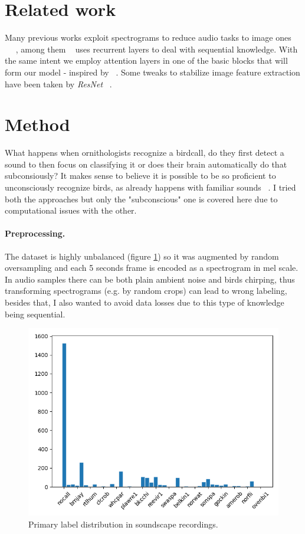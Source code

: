 \documentclass{article}
\begin{document}
\section{Related work}
Many previous works exploit spectrograms to reduce audio tasks to image ones ~\cite{hamdyaudio} ~\cite{michelashvili2020denoising} ~\cite{xie2021audio}, among them ~\cite{xie2021audio} uses recurrent layers to deal with sequential knowledge.
With the same intent we employ attention layers in one of the basic blocks that will form our model - inspired by ~\cite{zhang2020resnest}.
Some tweaks to stabilize image feature extraction have been taken by \textit{ResNet} ~\cite{he2016deep}.

\section{Method} \label{sec:method}
What happens when ornithologists recognize a birdcall, do they first detect a sound to then focus on classifying it or does their brain automatically do that subconsiously?
It makes sense to believe it is possible to be so proficient to unconsciously recognize birds, as already happens with familiar sounds ~\cite{kirmse2009familiarity}. 
I tried both the approaches but only the "subconscious" one is covered here due to computational issues with the other.

\paragraph*{Preprocessing.}
The dataset is highly unbalanced (figure \ref{fig:soundscapes_classification_freq}) 
so it was augmented by random oversampling and each 5 seconds frame is encoded as a spectrogram in mel scale.
In audio samples there can be both plain ambient noise and birds chirping, thus transforming spectrograms (e.g. by random crops) can lead to wrong labeling, besides that, I also wanted to avoid data losses due to this type of knowledge being sequential.

\begin{figure}
    \centering
    \includegraphics[scale=.35]{images/soundscapes_distribution_birds.png}
    \caption{Primary label distribution in soundscape recordings.}
    \label{fig:soundscapes_classification_freq}
\end{figure}
\end{document}
